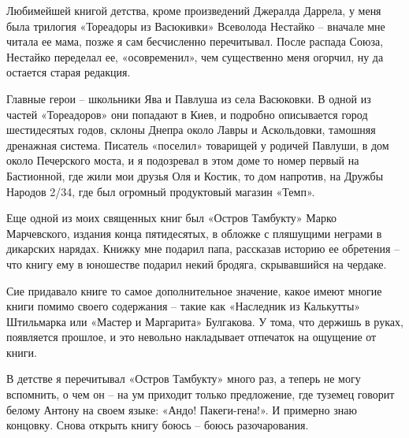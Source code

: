 Любимейшей книгой детства, кроме произведений Джералда Даррела, у меня была трилогия «Тореадоры из Васюкивки» Всеволода Нестайко – вначале мне читала ее мама, позже я сам бесчисленно перечитывал. После распада Союза, Нестайко переделал ее, «осовременил», чем существенно меня огорчил, ну да остается старая редакция.

Главные герои – школьники Ява и Павлуша из села Васюковки. В одной из частей «Тореадоров» они попадают в Киев, и подробно описывается город шестидесятых годов, склоны Днепра около Лавры и Аскольдовки, тамошняя дренажная система. Писатель «поселил» товарищей у родичей Павлуши, в дом около Печерского моста, и я подозревал в этом доме то номер первый на Бастионной, где жили мои друзья Оля и Костик, то дом напротив, на Дружбы Народов 2/34, где был огромный продуктовый магазин «Темп».

Еще одной из моих священных книг был «Остров Тамбукту» Марко Марчевского, издания конца пятидесятых, в обложке с пляшущими неграми в дикарских нарядах. Книжку мне подарил папа, рассказав историю ее обретения – что книгу ему в юношестве подарил некий бродяга, скрывавшийся на чердаке.

Сие придавало книге то самое дополнительное значение, какое имеют многие книги помимо своего содержания – такие как «Наследник из Калькутты» Штильмарка или «Мастер и Маргарита» Булгакова. У тома, что держишь в руках, появляется прошлое, и это невольно накладывает отпечаток на ощущение от книги. 

В детстве я перечитывал «Остров Тамбукту» много раз, а теперь не могу вспомнить, о чем он – на ум приходит только предложение, где туземец говорит белому Антону на своем языке: «Андо! Пакеги-гена!». И примерно знаю концовку. Снова открыть книгу боюсь – боюсь разочарования.



